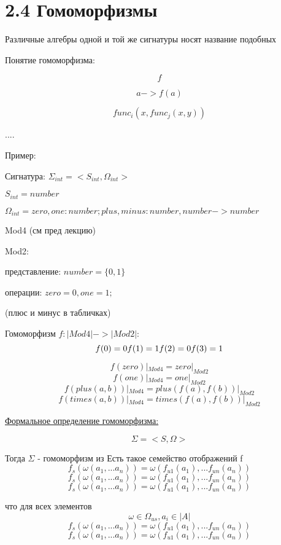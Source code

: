 \documentclass[a4paper, 12pt]{article}
\begin{document}
\section{2.4 Гомоморфизмы}

Различные алгебры одной и той же сигнатуры носят название подобных

Понятие гомоморфизма:

$$
    f 
$$

$$
a -> f(a)
$$

$$
func_{i}(x, func_j(x, y))
$$

....

Пример: 

Сигнатура: $\Sigma_{int} = <S_{int}, \Omega_{int}>$

$S_{int} = {number}$

$\Omega_{int} = {zero, one: number; plus, minus: number, number -> number}$

Mod4 (см пред лекцию)

Mod2:

представление: $number = \{ 0, 1\}$

операции: $zero = 0, one = 1;$

(плюс и минус в табличках)

Гомоморфизм $f: |Mod4| -> |Mod2|$: 
$$
    f(0)=0 \\
    f(1) = 1 \\
    f(2) = 0 \\
    f(3) = 1 \\
$$

$$f(zero) |_{Mod4} = zero|_{Mod2}$$
$$f(one) |_{Mod4} = one|_{Mod2}$$
$$f(plus(a, b)) |_{Mod4} = plus(f(a), f(b))|_{Mod2}$$
$$f(times(a, b)) |_{Mod4} = times(f(a), f(b))|_{Mod2}$$

\underline{Формальное определение гомоморфизма:}

$$
\Sigma = <S, \Omega>
$$

Тогда $\Sigma$ - гомоморфизм из 
Есть такое семейство отображений f
$$ f_s(\omega(a_1, ... a_n)) = \omega(f_{u1}(a_1), ... f_{un}(a_n))  $$
$$ f_s(\omega(a_1, ... a_n)) = \omega(f_{u1}(a_1), ... f_{un}(a_n))  $$
$$ f_s(\omega(a_1, ... a_n)) = \omega(f_{u1}(a_1), ... f_{un}(a_n))  $$

что для всех элементов $$\omega \in \Omega_{us}, a_i \in |A|$$
$$ f_s(\omega(a_1, ... a_n)) = \omega(f_{u1}(a_1), ... f_{un}(a_n))  $$
$$ f_s(\omega(a_1, ... a_n)) = \omega(f_{u1}(a_1), ... f_{un}(a_n))  $$
\end{document}
